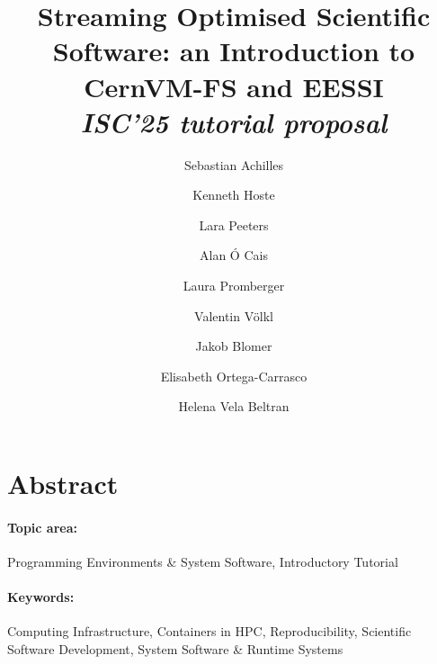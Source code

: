 \documentclass[a4paper,11pt]{article}
\begin{document}

\title{
    \textbf{\LARGE Streaming Optimised Scientific Software: an Introduction to CernVM-FS and EESSI}\\
\Large \emph{ISC'25 tutorial proposal}
}

\date{}

\author[1]{Sebastian Achilles}
\author[2]{Kenneth Hoste}
\author[2]{Lara Peeters}
\author[3]{Alan \'O Cais}
\author[4]{Laura Promberger}
\author[4]{Valentin V\"olkl}
\author[4]{Jakob Blomer}
\author[5]{Elisabeth Ortega-Carrasco}
\author[5]{Helena Vela Beltran}


\renewcommand\Authands{ and }

\maketitle


\section*{Abstract}


\paragraph{Topic area:} Programming Environments \& System Software, Introductory Tutorial

\paragraph{Keywords:} Computing Infrastructure, Containers in HPC, Reproducibility, Scientific Software Development, System Software \& Runtime Systems



\newpage
 
\end{document}
